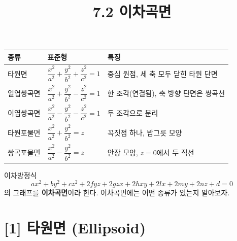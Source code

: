 \documentclass{article}
\title{7.2 이차곡면 }
\date{}
\author{}
\theoremstyle{mystyle}
\begin{document}
\maketitle

\begin{tcolorbox}[colback=blue!5, colframe=blue!60!black, title=7.2 이차곡면 -- 한눈에 보기, boxrule=0.5mm, arc=3mm]
\begin{center}
\renewcommand{\arraystretch}{1.3}
\begin{tabular}{|p{2.5cm}|p{6cm}|p{5.5cm}|}
\hline
\textbf{종류} & \textbf{표준형} & \textbf{특징} \\
\hline
타원면 & $\dfrac{x^2}{a^2}+\dfrac{y^2}{b^2}+\dfrac{z^2}{c^2}=1$ & 중심 원점, 세 축 모두 닫힌 타원 단면 \\
\hline
일엽쌍곡면 & $\dfrac{x^2}{a^2}+\dfrac{y^2}{b^2}-\dfrac{z^2}{c^2}=1$ & 한 조각(연결됨), 축 방향 단면은 쌍곡선 \\
\hline
이엽쌍곡면 & $\dfrac{x^2}{a^2}-\dfrac{y^2}{b^2}-\dfrac{z^2}{c^2}=1$ & 두 조각으로 분리 \\
\hline
타원포물면 & $\dfrac{x^2}{a^2}+\dfrac{y^2}{b^2}=z$ & 꼭짓점 하나, 밥그릇 모양 \\
\hline
쌍곡포물면 & $\dfrac{x^2}{a^2}-\dfrac{y^2}{b^2}=z$ & 안장 모양, $z=0$에서 두 직선 \\
\hline
\end{tabular}
\end{center}
\end{tcolorbox}

이차방정식
\[
ax^2+by^2+cz^2+2fyz+2gzx+2hxy+2lx+2my+2nz+d=0
\]
의 그래프를 \textbf{이차곡면}이라 한다. 이차곡면에는 어떤 종류가 있는지 알아보자.

\section*{[1] 타원면 (Ellipsoid)}
\end{document}
